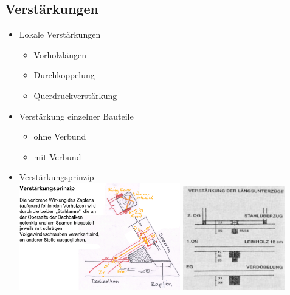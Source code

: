 \documentclass[fleqn,twoside]{article}
\begin{document}
 \subsection{Verstärkungen}
    \begin{itemize}
        \item Lokale Verstärkungen
            \begin{itemize}
                \item Vorholzlängen
                \item Durchkoppelung
                \item Querdruckverstärkung
            \end{itemize}
        \item Verstärkung einzelner Bauteile
            \begin{itemize}
                \item ohne Verbund
                \item mit Verbund
            \end{itemize}
        \item Verstärkungsprinzip\\
            \includegraphics[width=0.55\textwidth]{Grafiken/Denkmalpflegerische Arbeit/Verstaerkungsprinzip/Verstaerkungsprinzip.png}
            \includegraphics[width=0.35\textwidth]{Grafiken/Denkmalpflegerische Arbeit/Verstaerkungsprinzip/Verstaerkung Laengsunterzuege.jpg}
    \end{itemize}

 
 
\end{document}
